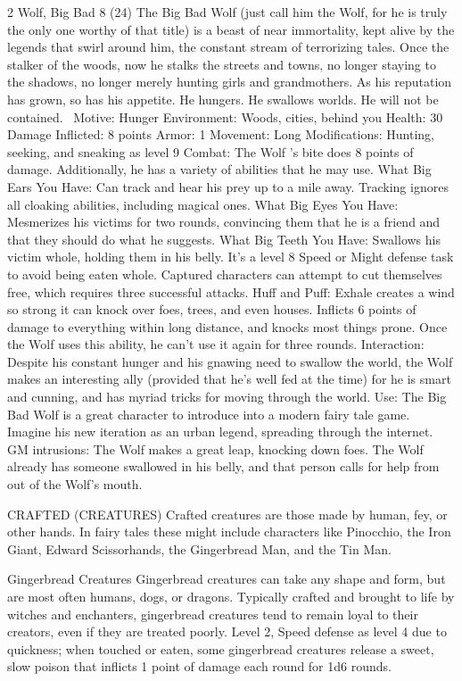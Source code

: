 \begin{multicols}{2}
Wolf, Big Bad 8 (24)
The Big Bad Wolf (just call him the Wolf, for he is truly the only one worthy of that title) is a beast of near immortality, kept alive by the legends that swirl around him, the constant stream of terrorizing tales. Once the stalker of the woods, now he stalks the streets and towns, no longer staying to the shadows, no longer merely hunting girls and grandmothers. As his reputation has grown, so has his appetite. He hungers. He swallows worlds. He will not be contained. 
Motive: Hunger
Environment: Woods, cities, behind you
Health: 30
Damage Inflicted: 8 points
Armor: 1
Movement: Long
Modifications: Hunting, seeking, and sneaking as level 9
Combat: The Wolf ’s bite does 8 points of damage. Additionally, he has a variety of abilities that he may use.
What Big Ears You Have: Can track and hear his prey up to a mile away. Tracking ignores all cloaking abilities, including magical ones.
What Big Eyes You Have: Mesmerizes his victims for two rounds, convincing them that he is a friend and that they should do what he suggests.
What Big Teeth You Have: Swallows his victim whole, holding them in his belly. It’s a level 8 Speed or Might defense task to avoid being eaten whole. Captured characters can attempt to cut themselves free, which requires three successful attacks.
Huff and Puff: Exhale creates a wind so strong it can knock over foes, trees, and even houses. Inflicts 6 points of damage to everything within long distance, and knocks most things prone. Once the Wolf uses this ability, he can’t use it again for three rounds.
Interaction: Despite his constant hunger and his gnawing need to swallow the world, the Wolf makes an interesting ally (provided that he’s well fed at the time) for he is smart and cunning, and has myriad tricks for moving through the world.
Use: The Big Bad Wolf is a great character to introduce into a modern fairy tale game. Imagine his new iteration as an urban legend, spreading through the internet.
GM intrusions: The Wolf makes a great leap, knocking down foes. The Wolf already has someone swallowed in his belly, and that person calls for help from out of the Wolf’s mouth.

CRAFTED (CREATURES)
Crafted creatures are those made by human, fey, or other hands. In fairy tales these might include characters like Pinocchio,
the Iron Giant, Edward Scissorhands, the Gingerbread Man, and the Tin Man.

Gingerbread Creatures
Gingerbread creatures can take any shape and form, but are most often humans, dogs, or dragons. Typically crafted and brought to life by witches and enchanters, gingerbread creatures tend to remain loyal to their creators, even if they are treated poorly.
Level 2, Speed defense as level 4 due to quickness; when touched or eaten, some gingerbread creatures release a sweet, slow poison that inflicts 1 point of damage each round for 1d6 rounds.


\end{multicols}
